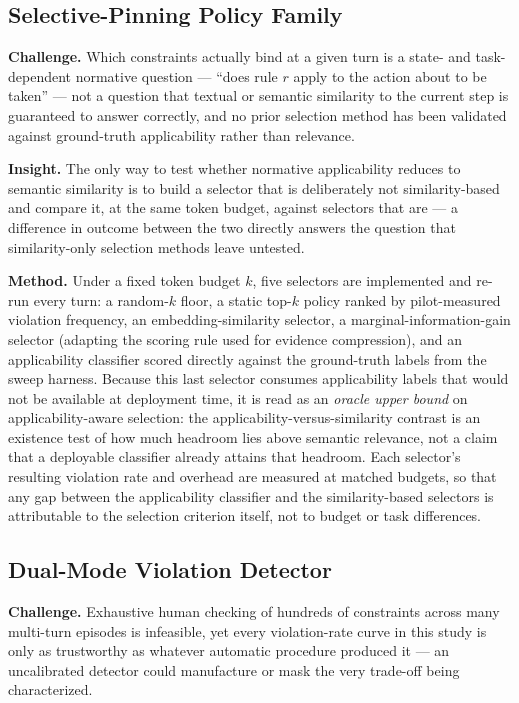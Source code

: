 \documentclass[11pt]{article}
\begin{document}
\subsection{Selective-Pinning Policy Family}
\textbf{Challenge.} Which constraints actually bind at a given turn is a state- and task-dependent normative question --- ``does rule $r$ apply to the action about to be taken'' --- not a question that textual or semantic similarity to the current step is guaranteed to answer correctly, and no prior selection method has been validated against ground-truth applicability rather than relevance.

\textbf{Insight.} The only way to test whether normative applicability reduces to semantic similarity is to build a selector that is deliberately not similarity-based and compare it, at the same token budget, against selectors that are --- a difference in outcome between the two directly answers the question that similarity-only selection methods leave untested.

\textbf{Method.} Under a fixed token budget $k$, five selectors are implemented and re-run every turn: a random-$k$ floor, a static top-$k$ policy ranked by pilot-measured violation frequency, an embedding-similarity selector, a marginal-information-gain selector (adapting the scoring rule used for evidence compression), and an applicability classifier scored directly against the ground-truth labels from the sweep harness. Because this last selector consumes applicability labels that would not be available at deployment time, it is read as an \emph{oracle upper bound} on applicability-aware selection: the applicability-versus-similarity contrast is an existence test of how much headroom lies above semantic relevance, not a claim that a deployable classifier already attains that headroom. Each selector's resulting violation rate and overhead are measured at matched budgets, so that any gap between the applicability classifier and the similarity-based selectors is attributable to the selection criterion itself, not to budget or task differences.

\subsection{Dual-Mode Violation Detector}
\textbf{Challenge.} Exhaustive human checking of hundreds of constraints across many multi-turn episodes is infeasible, yet every violation-rate curve in this study is only as trustworthy as whatever automatic procedure produced it --- an uncalibrated detector could manufacture or mask the very trade-off being characterized.
\end{document}
